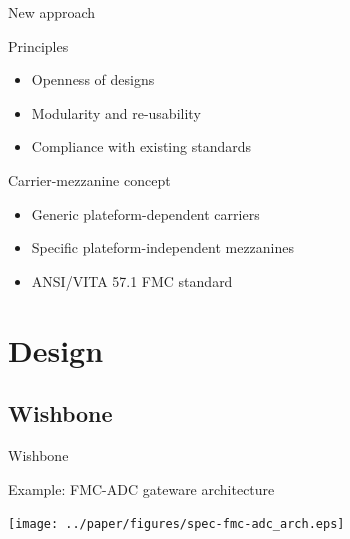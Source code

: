 \documentclass[compress,red]{beamer}
\begin{document}
\begin{frame}{New approach}

  \begin{block}{Principles}
    \begin{itemize}
    \item
      Openness of designs
    \item
      Modularity and re-usability
    \item
      Compliance with existing standards
    \end{itemize}
  \end{block}

  \begin{block}{Carrier-mezzanine concept}
    \begin{itemize}
    \item
      Generic plateform-dependent carriers
    \item
      Specific plateform-independent mezzanines
    \item
      ANSI/VITA 57.1 FMC standard
    \end{itemize}
  \end{block}

\end{frame}


\section{Design}

\subsection{Wishbone}

\begin{frame}{Wishbone}
\end{frame}

\begin{frame}{Example: FMC-ADC gateware architecture}

  \begin{center}
    \texttt{[image: ../paper/figures/spec-fmc-adc\_arch.eps]}
  \end{center}

\end{frame}
\end{document}
